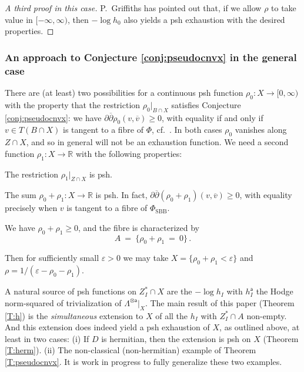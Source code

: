 \documentclass[12pt]{amsart}
\numberwithin{equation}{section}
\numberwithin{table}{section}
\def\e{\varepsilon}
\def\sfa{\mathsf{a}}
\def\bR{\mathbb{R}}
\def\ot{\otimes}
\theoremstyle{definition}
\theoremstyle{definition}
\theoremstyle{remark}
\newenvironment{i_list}
  {\begin{enumerate}[label=(\roman*),itemsep=3pt,leftmargin=25pt,listparindent=20pt]}
  {\end{enumerate}}
\def\ddb{\partial\overline{\partial}}
\def\PhiS{\Phi_\mathrm{SBB}}
\begin{document}
\begin{proof}[A third proof in this case]
P.~Griffiths has pointed out that, if we allow $\rho$ to take value in $[-\infty,\infty)$, then $-\log h_0$ also yields a psh exhaustion with the  desired properties.
\end{proof}

\subsubsection{An approach to Conjecture \ref{conj:pseudocnvx} in the general case} \label{S:prf-pcnvx}

There are (at least) two possibilities for a continuous psh function $\rho_0 : X \to [0,\infty)$ with the property that the restriction $\rho_0 \big|_{B \cap X}$ satisfies Conjecture \ref{conj:pseudocnvx}: we have $\ddb \rho_0( v , \overline v) \ge 0$, with equality if and only if $v \in T(B\cap X)$ is tangent to a fibre of $\Phi$, cf.~\cite{Robles-pseudocnvx-eg}.  In both cases $\rho_0$ vanishes along $Z \cap X$, and so in general will not be an exhaustion function.  We need a second function $\rho_1 : X \to \bR$ with the following properties:
\begin{i_list}
\item
The restriction $\rho_1\big|_{Z \cap X}$ is psh.
\item \label{i:psh}
The sum $\rho_0 + \rho_1 : X \to \bR$ is psh.  In fact, $\ddb (\rho_0+\rho_1)( v , \overline v) \ge 0$, with equality precisely when $v$ is tangent to a fibre of $\PhiS$.
\item \label{i:A}
We have $\rho_0 + \rho_1 \ge 0$, and the fibre is characterized by 
\[
	A \ = \ \{ \rho_0 + \rho_1 \ = \ 0 \} \,.
\]
\end{i_list}
Then for sufficiently small $\e>0$ we may take $X = \{ \rho_0+\rho_1 < \e\}$ and $\rho = 1/(\e-\rho_0-\rho_1)$.

A natural source of psh functions on $Z_I^* \cap X$ are the $-\log h_I$ with $h_I^\sfa$ the Hodge norm-squared of trivialization  of $\Lambda^{\ot \sfa}\big|_X$.  The main result of this paper (Theorem \ref{T:h}) is the \emph{simultaneous} extension to $X$ of all the  $h_I$ with $Z_I^* \cap A$ non-empty.  And this extension does indeed yield a psh exhaustion of $X$, as outlined above, at least in two cases:  (i)  If $D$ is hermitian, then the extension is psh on $X$ (Theorem \ref{T:herm}).  (ii) The non-classical (non-hermitian) example of Theorem \ref{T:pseudocnvx}.  It is work in  progress to fully generalize these two examples.
\end{document}
